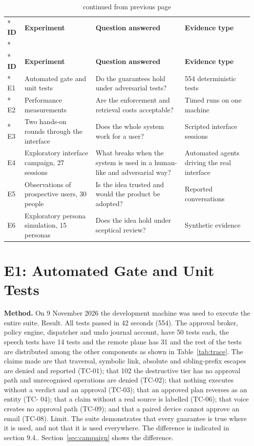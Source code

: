 \documentclass{FastFyp}
\begin{document}
{
\begin{longtable}{|p{0.9cm}|p{4.2cm}|p{4.3cm}|p{3.8cm}|}
\caption{The experiments reported in this chapter.}\label{tab:experiments}\\*
\hline
\textbf{ID} & \textbf{Experiment} & \textbf{Question answered} & \textbf{Evidence type} \\*
\hline
\endfirsthead
\caption[]{continued from previous page}\\*
\hline
\textbf{ID} & \textbf{Experiment} & \textbf{Question answered} & \textbf{Evidence type} \\*
\hline
\endhead
\hline
E1 & Automated gate and unit tests & Do the guarantees hold under adversarial tests? & 554 deterministic tests \\*
\hline
E2 & Performance measurements & Are the enforcement and retrieval costs acceptable? & Timed runs on one machine \\*
\hline
E3 & Two hands-on rounds through the interface & Does the whole system work for a user? & Scripted interface sessions \\
\hline
E4 & Exploratory interface campaign, 27 sessions & What breaks when the system is used in a human-like and adversarial way? & Automated agents driving the real interface \\
\hline
E5 & Observations of prospective users, 30 people & Is the idea trusted and would the product be adopted? & Reported conversations \\
\hline
E6 & Exploratory persona simulation, 15 personas & Does the idea hold under sceptical review? & Synthetic evidence \\
\hline
\end{longtable}
}

\section{E1: Automated Gate and Unit Tests}
\textbf{Method.} On 9 November 2026 the development machine was used to execute the entire suite. Result. All tests passed in 42 seconds (554). The approval broker, policy engine, dispatcher and undo journal account, have 50 tests each, the speech tests have 14 tests and the remote plane has 31 and the rest of the tests are distributed among the other components as shown in Table~\ref{tab:trace}. The claims made are that traversal, symbolic link, absolute and sibling-prefix escapes are denied and reported (TC-01); that 102 the destructive tier has no approval path and unrecognised operations are denied (TC-02); that nothing executes without a verdict and an approval (TC-03); that an approved plan reverses as an entity (TC- 04); that a claim without a real source is labelled (TC-06); that voice creates no approval path (TC-09); and that a paired device cannot approve an email (TC-08). Limit. The suite demonstrates that every guarantee is true where it is used, and not that it is used everywhere. The difference is indicated in section 9.4.. Section~\ref{sec:campaign} shows the difference.
\end{document}
